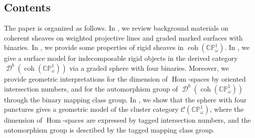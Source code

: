 \documentclass[11pt,a4paper,reqno]{amsart}%
\theoremstyle{plain}
\theoremstyle{definition}
\numberwithin{equation}{section}
\numberwithin{equation}{section}
\newcommand{\Hom}{\operatorname{Hom}\nolimits}
\newcommand{\D}{\operatorname{\mathcal{D}}}
\def\wt{\omega}
\def\coh{\operatorname{coh}}
\def\Hom{\operatorname{Hom}}
\def\coh{\operatorname{coh}}
\def\CPone{\mathbb{CP}^1_{\wt}}
\newcommand\DC[1]{\D^b(\coh(#1))}
\def\CCP{\mathcal{C}(\CPone)}
\begin{document}
\subsection{Contents}
The paper is organized as follows. In , we review background materials on coherent sheaves on weighted projective lines and graded marked surfaces with binaries. In , we provide some properties of rigid sheaves in $\coh(\CPone)$. In , we give a surface model for indecomposable rigid objects in  the derived category $\DC{\CPone}$ via a graded sphere with four binaries. Moreover, we provide geometric interpretations for the dimension of $\Hom$-spaces by oriented intersection
numbers, and for the automorphism group of   $\DC{\CPone}$ through the binary mapping class group. In , we show that the sphere with four punctures gives a geometric model of 
 the cluster category  $\CCP$, where  the dimension of  $\Hom$-spaces  are expressed by tagged intersection numbers, and the automorphism group is described by the tagged mapping class group.
 
\end{document}

